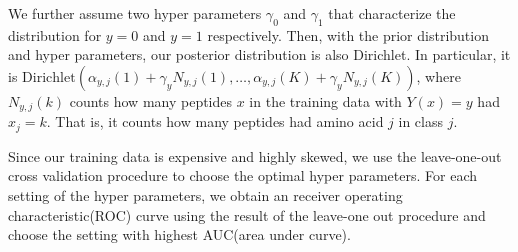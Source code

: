 \documentclass[opre,nonblindrev]{informs3} %
\newcommand{\Dir}{\mathrm{Dirichlet}}
\begin{document}
We further assume two hyper parameters $\gamma_0$ and $\gamma_1$ that characterize the distribution for $y=0$ and $y=1$ respectively. Then, with the prior distribution and hyper parameters, our posterior distribution is also Dirichlet. In particular, it is 
$\Dir( \alpha_{y,j}(1) + \gamma_yN_{y,j}(1), \ldots, \alpha_{y,j}(K) + \gamma_yN_{y,j}(K))$,
where $N_{y,j}(k)$ counts how many peptides $x$ in the training data with $Y(x)=y$ had $x_j=k$.  That is, it counts how many peptides had amino acid $j$ in class $j$.

Since our training data is expensive and highly skewed, we use the leave-one-out cross validation procedure to choose the optimal hyper parameters. For each setting of the hyper parameters, we obtain an receiver operating characteristic(ROC) curve using the result of the leave-one out procedure and choose the setting with highest AUC(area under curve).

\end{document}
